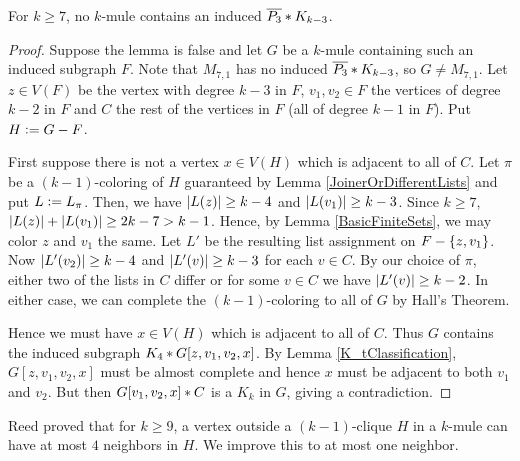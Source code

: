 \begin{lem}\label{NoTwooks}
For $k \geq 7$, no $k$-mule contains an induced $\overline{P_3} \mbox{\hspace{2 pt}$\ast$\hspace{2 pt}} K_{k - 3}$.
\end{lem}
\begin{proof}
Suppose the lemma is false and let $G$ be a $k$-mule containing such an induced
subgraph $F$.  Note that $M_{7,1}$ has no induced $\overline{P_3} \mbox{\hspace{2 pt}$\ast$\hspace{2 pt}} K_{k -
3}$, so $G \neq M_{7,1}$. Let $z \in V(F)$ be the vertex with degree $k-3$ in
$F$, $v_1, v_2 \in F$ the vertices of degree $k-2$ in $F$ and $C$ the rest of the vertices in $F$ (all of degree $k-1$ in $F$). 
Put $H \mathrel{\mathop:}= G - F$.

First suppose there is not a vertex $x \in V(H)$ which is adjacent to all of $C$. 
Let $\pi$ be a $(k - 1)$-coloring of $H$ guaranteed by Lemma
\ref{JoinerOrDifferentLists} and put $L \mathrel{\mathop:}= L_\pi$.  Then, we have
$\left|L(z)\right| \geq k-4$ and $\left|L(v_1)\right| \geq k-3$.  
Since $k \geq 7$, $\left|L(z)\right| + \left|L(v_1)\right| \geq 2k - 7 > k - 1$.  
Hence, by Lemma \ref{BasicFiniteSets}, we may color $z$ and $v_1$ the same.  
Let $L'$ be the resulting list assignment on $F - \left\{ z, v_1 \right\}$. 
Now $\left|L'(v_2)\right| \geq k-4$ and $\left|L'(v)\right| \geq k-3$ for each $v \in C$. 
By our choice of $\pi$, either two of the lists in $C$ differ or for some $v \in C$ we have $\left|L'(v)\right| \geq k-2$.  
In either case, we can complete the $(k - 1)$-coloring to all of $G$ by Hall's Theorem.

Hence we must have $x \in V(H)$ which is adjacent to all of $C$.
Thus $G$ contains the induced subgraph $K_4 \mbox{\hspace{2 pt}$\ast$\hspace{2 pt}} G[z, v_1, v_2, x]$.  
By Lemma \ref{K_tClassification}, $G[z, v_1, v_2, x]$ must be almost complete and hence $x$ must be adjacent to both $v_1$ and $v_2$.  
But then $G[v_1, v_2, x] \mbox{\hspace{2 pt}$\ast$\hspace{2 pt}} C$ is a $K_k$ in $G$, giving a contradiction.
\end{proof}

Reed proved that for $k \geq 9$, a vertex outside a $(k - 1)$-clique $H$ in a
$k$-mule can have at most $4$ neighbors in $H$.  We improve this to at most one
neighbor.



